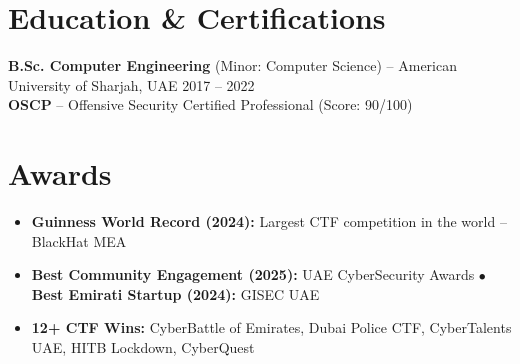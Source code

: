\documentclass[10pt,a4paper]{article}
\begin{document}
\section{Education \& Certifications}
{\small
\textbf{B.Sc. Computer Engineering} (Minor: Computer Science) -- American University of Sharjah, UAE \hfill 2017 -- 2022\\
\textbf{OSCP} -- Offensive Security Certified Professional (Score: 90/100)
}

\section{Awards}
{\small
\begin{itemize}
    \item \textbf{Guinness World Record (2024):} Largest CTF competition in the world -- BlackHat MEA
    \item \textbf{Best Community Engagement (2025):} UAE CyberSecurity Awards \quad $\bullet$ \quad \textbf{Best Emirati Startup (2024):} GISEC UAE
    \item \textbf{12+ CTF Wins:} CyberBattle of Emirates, Dubai Police CTF, CyberTalents UAE, HITB Lockdown, CyberQuest
\end{itemize}
}
\end{document}
